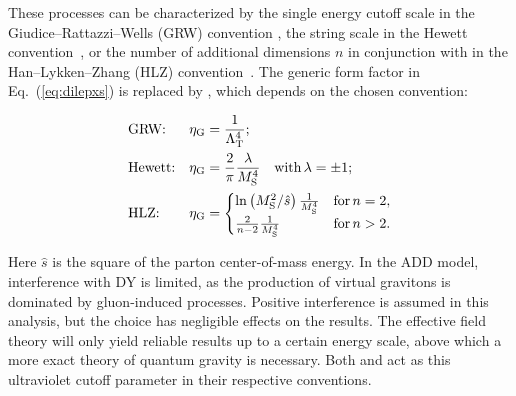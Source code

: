 \documentclass[11pt,twoside,a4paper,cmspaper,final,collab]{cms-tdr}
\begin{document}
These processes can be characterized by the single energy cutoff scale  in the Giudice--Rattazzi--Wells (GRW) convention \cite{GRW99:extradim}, the string scale  in the Hewett convention~\cite{Hewett:1998sn}, or the number of additional dimensions $n$ in conjunction with  in the Han--Lykken--Zhang (HLZ) convention~\cite{han99:hlz}.
The generic form factor  in Eq.~(\ref{eq:dilepxs}) is replaced by , which depends on the chosen convention:
\begin{linenomath}
\begin{align}
  \label{eq:grw}
  & \text{GRW:}    & \eta_{\mathrm{G}} &= \frac{1}{\Lambda_{\mathrm{T}}^4}; \\
  \label{eq:hew}
  & \text{Hewett:} & \eta_{\mathrm{G}} &= \frac{2}{\pi} \frac{\lambda}{M_{\mathrm{S}}^4} \quad\text{with}\,\lambda=\pm 1; \\
  \label{eq:hlz}
  & \text{HLZ:}    & \eta_{\mathrm{G}} &=
  \begin{cases}
    \ln\left({M_{\mathrm{S}}^2}/{\hat{s}}\right)\frac{1}{M_{\mathrm{S}}^4} & \text{for}\,n = 2,        \\
    \frac{2}{n-2} \frac{1}{M_{\mathrm{S}}^4}                            & \text{for}\,n > 2\text{.}
  \end{cases}
\end{align}
\end{linenomath}
Here $\hat{s}$ is the square of the parton center-of-mass energy. In the ADD model, interference with DY is limited, as the production of virtual gravitons is dominated by gluon-induced processes. Positive interference is assumed in this analysis, but the choice has negligible effects on the results. The effective field theory will only yield reliable results up to a certain energy scale, above which a more exact theory of quantum gravity is necessary. Both   and  act as this ultraviolet cutoff parameter in their respective conventions.
\end{document}

